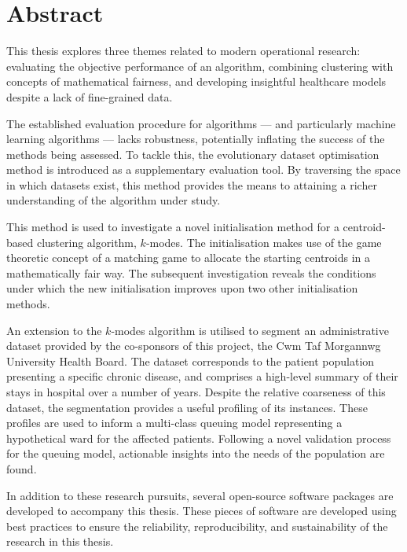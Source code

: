 \chapter*{Abstract}

This thesis explores three themes related to modern operational research:
evaluating the objective performance of an algorithm, combining clustering with
concepts of mathematical fairness, and developing insightful healthcare models
despite a lack of fine-grained data.

The established evaluation procedure for algorithms --- and particularly machine
learning algorithms --- lacks robustness, potentially inflating the success of
the methods being assessed. To tackle this, the evolutionary dataset
optimisation method is introduced as a supplementary evaluation tool. By
traversing the space in which datasets exist, this method provides the means to
attaining a richer understanding of the algorithm under study.

This method is used to investigate a novel initialisation method for a
centroid-based clustering algorithm, \(k\)-modes. The initialisation makes use
of the game theoretic concept of a matching game to allocate the starting
centroids in a mathematically fair way. The subsequent investigation reveals the
conditions under which the new initialisation improves upon two other
initialisation methods.

An extension to the \(k\)-modes algorithm is utilised to segment an
administrative dataset provided by the co-sponsors of this project, the Cwm Taf
Morgannwg University Health Board. The dataset corresponds to the patient
population presenting a specific chronic disease, and comprises a high-level
summary of their stays in hospital over a number of years. Despite the relative
coarseness of this dataset, the segmentation provides a useful profiling of its
instances. These profiles are used to inform a multi-class queuing model
representing a hypothetical ward for the affected patients. Following a novel
validation process for the queuing model, actionable insights into the needs of
the population are found.

In addition to these research pursuits, several open-source software packages
are developed to accompany this thesis. These pieces of software are developed
using best practices to ensure the reliability, reproducibility, and
sustainability of the research in this thesis.
